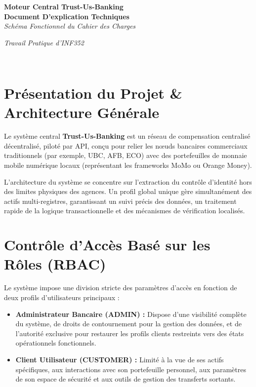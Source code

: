 \documentclass[12pt,a4paper]{article}
\begin{document}
	
	\begin{titlepage}
		\centering
		\vspace*{2cm}
		{\Huge\bfseries Moteur Central Trust-Us-Banking}\\[0.5cm]
		{\Large\bfseries Document D'explication Techniques}\\[0.2cm]
		{\large \textit{Schéma Fonctionnel du Cahier des Charges}}\\[2cm]
		
		\begin{minipage}{0.6\textwidth}
			\centering
			\textit{Travail Pratique d'INF352}\\
		\end{minipage}\\[3cm]
		
	\end{titlepage}
	
	\newpage
	
	\section{Présentation du Projet \& Architecture Générale}
	Le système central \textbf{Trust-Us-Banking} est un réseau de compensation centralisé décentralisé, piloté par API, conçu pour relier les nœuds bancaires commerciaux traditionnels (par exemple, UBC, AFB, ECO) avec des portefeuilles de monnaie mobile numérique locaux (représentant les frameworks MoMo ou Orange Money).
	
	L'architecture du système se concentre sur l'extraction du contrôle d'identité hors des limites physiques des agences. Un profil global unique gère simultanément des actifs multi-registres, garantissant un suivi précis des données, un traitement rapide de la logique transactionnelle et des mécanismes de vérification localisés.
	
	\section{Contrôle d'Accès Basé sur les Rôles (RBAC)}
	Le système impose une division stricte des paramètres d'accès en fonction de deux profils d'utilisateurs principaux :
	\begin{itemize}
		\item \textbf{Administrateur Bancaire (ADMIN) :} Dispose d'une visibilité complète du système, de droits de contournement pour la gestion des données, et de l'autorité exclusive pour restaurer les profils clients restreints vers des états opérationnels fonctionnels.
		\item \textbf{Client Utilisateur (CUSTOMER) :} Limité à la vue de ses actifs spécifiques, aux interactions avec son portefeuille personnel, aux paramètres de son espace de sécurité et aux outils de gestion des transferts sortants.
	\end{itemize}
	
\end{document}
